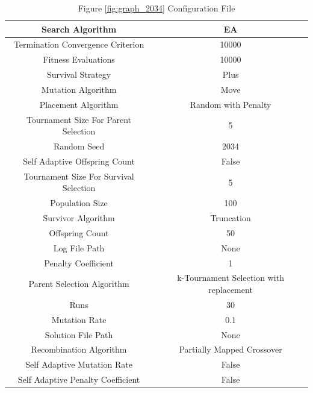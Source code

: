 \documentclass{standalone}
\begin{document}
\begin{table}[!htb]
	\centering
	\caption{Figure \ref{fig:graph_2034} Configuration File}
	\label{tab:graph_2034}
	\begin{tabular}{| c | c |}
		\hline
		Search Algorithm		& EA		 \\
		\hline
		Termination Convergence Criterion		& 10000		 \\
		\hline
		Fitness Evaluations		& 10000		 \\
		\hline
		Survival Strategy		& Plus		 \\
		\hline
		Mutation Algorithm		& Move		 \\
		\hline
		Placement Algorithm		& Random with Penalty		 \\
		\hline
		Tournament Size For Parent Selection		& 5		 \\
		\hline
		Random Seed		& 2034		 \\
		\hline
		Self Adaptive Offspring Count		& False		 \\
		\hline
		Tournament Size For Survival Selection		& 5		 \\
		\hline
		Population Size		& 100		 \\
		\hline
		Survivor Algorithm		& Truncation		 \\
		\hline
		Offspring Count		& 50		 \\
		\hline
		Log File Path		& None		 \\
		\hline
		Penalty Coefficient		& 1		 \\
		\hline
		Parent Selection Algorithm		& k-Tournament Selection with replacement		 \\
		\hline
		Runs		& 30		 \\
		\hline
		Mutation Rate		& 0.1		 \\
		\hline
		Solution File Path		& None		 \\
		\hline
		Recombination Algorithm		& Partially Mapped Crossover		 \\
		\hline
		Self Adaptive Mutation Rate		& False		 \\
		\hline
		Self Adaptive Penalty Coefficient		& False		 \\
		\hline
	\end{tabular}
\end{table}
\end{document}
